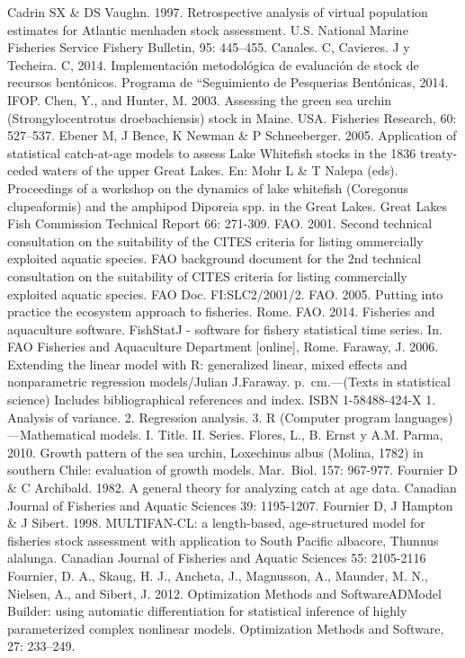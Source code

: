 \documentclass[
]{article}
\begin{document}
Cadrin SX \& DS Vaughn. 1997. Retrospective analysis of virtual
population estimates for Atlantic menhaden stock assessment. U.S.
National Marine Fisheries Service Fishery Bulletin, 95: 445--455.
Canales. C, Cavieres. J y Techeira. C, 2014. Implementación metodológica
de evaluación de stock de recursos bentónicos. Programa de ``Seguimiento
de Pesquerias Bentónicas, 2014. IFOP. Chen, Y., and Hunter, M. 2003.
Assessing the green sea urchin (Strongylocentrotus droebachiensis) stock
in Maine. USA. Fisheries Research, 60: 527--537. Ebener M, J Bence, K
Newman \& P Schneeberger. 2005. Application of statistical catch-at-age
models to assess Lake Whitefish stocks in the 1836 treaty-ceded waters
of the upper Great Lakes. En: Mohr L \& T Nalepa (eds). Proceedings of a
workshop on the dynamics of lake whitefish (Coregonus clupeaformis) and
the amphipod Diporeia spp. in the Great Lakes. Great Lakes Fish
Commission Technical Report 66: 271-309. FAO. 2001. Second technical
consultation on the suitability of the CITES criteria for listing
ommercially exploited aquatic species. FAO background document for the
2nd technical consultation on the suitability of CITES criteria for
listing commercially exploited aquatic species. FAO Doc. FI:SLC2/2001/2.
FAO. 2005. Putting into practice the ecosystem approach to fisheries.
Rome. FAO. 2014. Fisheries and aquaculture software. FishStatJ -
software for fishery statistical time series. In. FAO Fisheries and
Aquaculture Department {[}online{]}, Rome. Faraway, J. 2006. Extending
the linear model with R: generalized linear, mixed effects and
nonparametric regression models/Julian J.Faraway. p.~cm.---(Texts in
statistical science) Includes bibliographical references and index. ISBN
1-58488-424-X 1. Analysis of variance. 2. Regression analysis. 3. R
(Computer program languages)---Mathematical models. I. Title. II.
Series. Flores, L., B. Ernst y A.M. Parma, 2010. Growth pattern of the
sea urchin, Loxechinus albus (Molina, 1782) in southern Chile:
evaluation of growth models. Mar.~Biol. 157: 967-977. Fournier D \& C
Archibald. 1982. A general theory for analyzing catch at age data.
Canadian Journal of Fisheries and Aquatic Sciences 39: 1195-1207.
Fournier D, J Hampton \& J Sibert. 1998. MULTIFAN-CL: a length-based,
age-structured model for fisheries stock assessment with application to
South Pacific albacore, Thunnus alalunga. Canadian Journal of Fisheries
and Aquatic Sciences 55: 2105-2116 Fournier, D. A., Skaug, H. J.,
Ancheta, J., Magnusson, A., Maunder, M. N., Nielsen, A., and Sibert, J.
2012. Optimization Methods and SoftwareADModel Builder: using automatic
differentiation for statistical inference of highly parameterized
complex nonlinear models. Optimization Methods and Software, 27:
233--249.
\end{document}
